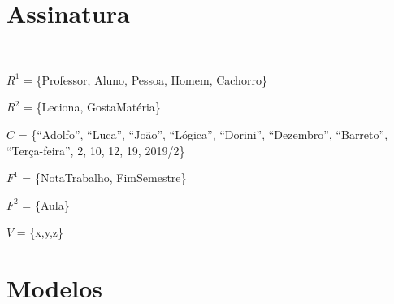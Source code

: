 \documentclass[12pt]{article}
\newcounter{const}
\newcounter{modelo}
\newcommand{\q}[1]{``#1''}
\newcommand{\conj}[2]{
    #1 = \{#2\}
    \medskip
}
\begin{document}
        
    \newpage



\section{Assinatura}
    
    \vspace{2mm}
    \begin{center} \scalebox{1.2}{$\sum{}{} = [R^1, R^2, R^3, C, F^1, F^2, V]$}\\ \end{center}
    \vspace{2mm}
    
    \conj{$R^1$}{Professor, Aluno, Pessoa, Homem, Cachorro}
    
    \conj{$R^2$}{Leciona, GostaMatéria}
    
    \conj{$C$}{\q{Adolfo}, \q{Luca}, \q{João}, \q{Lógica}, \q{Dorini}, \q{Dezembro}, \q{Barreto}, \q{Terça-feira}, 2, 10, 12, 19, 2019/2}
    
    \conj{$F^1$}{NotaTrabalho, FimSemestre}
    
    \conj{$F^2$}{Aula}
    
    \conj{$V$}{x,y,z}

\newpage



%


\section{Modelos}
    
\end{document}
